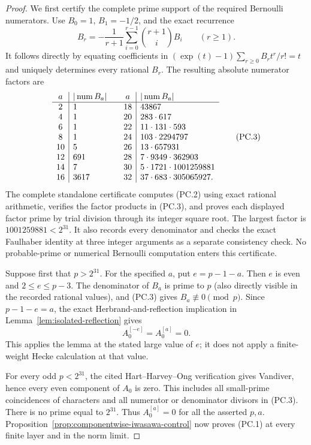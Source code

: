 \documentclass[11pt,a4paper]{article}
\theoremstyle{definition}
\begin{document}
\begin{proof}
We first certify the complete prime support of the required Bernoulli
numerators. Use $B_0=1$, $B_1=-1/2$, and the exact recurrence
\[
 B_r=-\frac1{r+1}\sum_{i=0}^{r-1}\binom{r+1}{i}B_i
                         \qquad(r\geq1).
 \tag{PC.2}
\]
It follows directly by equating coefficients in
$(\exp(t)-1)\sum_{r\geq0}B_rt^r/r!=t$ and uniquely determines
every rational $B_r$. The resulting absolute numerator factors are
\[
\begin{array}{c|l@{\qquad}c|l}
a&|\operatorname{num}B_a|&a&|\operatorname{num}B_a|\\ \hline
2&1&18&43867\\
4&1&20&283\cdot617\\
6&1&22&11\cdot131\cdot593\\
8&1&24&103\cdot2294797\\
10&5&26&13\cdot657931\\
12&691&28&7\cdot9349\cdot362903\\
14&7&30&5\cdot1721\cdot1001259881\\
16&3617&32&37\cdot683\cdot305065927.
\end{array}
 \tag{PC.3}
\]
The complete standalone certificate
computes (PC.2) using exact rational arithmetic, verifies the
factor products in (PC.3), and proves each displayed factor
prime by trial division through its integer square root.
The largest factor is $1001259881<2^{31}$. It also records every
denominator and checks the exact Faulhaber identity at three
integer arguments as a separate consistency check. No probable-prime
or numerical Bernoulli computation enters this certificate.

Suppose first that $p>2^{31}$. For the specified $a$, put
$e=p-1-a$. Then $e$ is even and $2\leq e\leq p-3$.
The denominator of $B_a$ is prime to $p$ (also directly visible
in the recorded rational values), and (PC.3) gives
$B_a\not\equiv0\pmod p$. Since $p-1-e=a$, the exact
Herbrand-and-reflection implication in
Lemma~\ref{lem:isolated-reflection} gives
\[
                         A_0^{[-e]}=A_0^{[a]}=0.
\]
This applies the lemma at the stated large value of $e$;
it does not apply a finite-weight Hecke calculation at that value.

For every odd $p<2^{31}$, the cited Hart--Harvey--Ong
verification gives Vandiver, hence every even component of
$A_0$ is zero. This includes all small-prime coincidences of
characters and all numerator or denominator divisors in (PC.3).
There is no prime equal to $2^{31}$. Thus $A_0^{[a]}=0$ for
all the asserted $p,a$. Proposition~\ref{prop:componentwise-iwasawa-control}
now proves (PC.1) at every finite layer and in the norm limit.


\end{proof}
\end{document}
